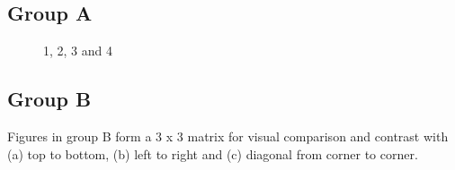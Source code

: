 \subsection{Group A}

\begin{figure}[H]
	\centering
	\begin{minipage}[b]{0.5\linewidth}
	\end{minipage}\hfill
	\begin{minipage}[b]{0.5\linewidth}
	\end{minipage}\hfill	
	\begin{minipage}[b]{0.5\linewidth}
	\end{minipage}\hfill
	\begin{minipage}[b]{0.5\linewidth}
	\end{minipage}\hfill
	\caption{1, 2, 3 and 4}
	\label{fig:Figure1}
\end{figure} 

\subsection{Group B}

Figures in group B form a 3 x 3 matrix for visual comparison and contrast with (a) top to bottom, (b) left to right and (c) diagonal from corner to corner.

